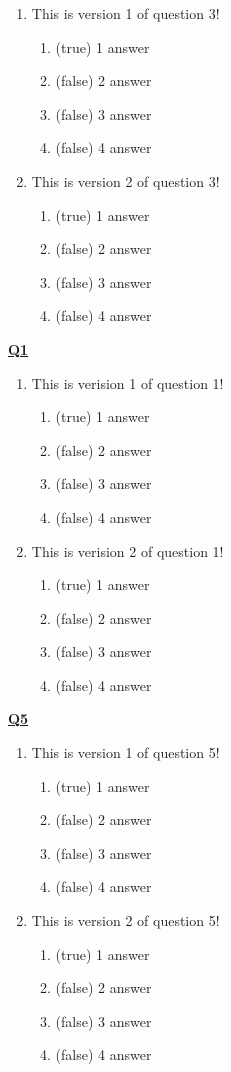 \documentclass[a4paper, 11pt]{article}
\begin{document}
\begin{enumerate}
\item This is version 1 of question 3!
\begin{enumerate}
\item (true)  1 answer
\item (false)  2 answer
\item (false)  3 answer
\item (false)  4 answer
\end{enumerate}
\item This is version 2 of question 3!
\begin{enumerate}
\item (true)  1 answer
\item (false)  2 answer
\item (false)  3 answer
\item (false)  4 answer
\end{enumerate}
\end{enumerate}
\flushleft \underline{\bf Q1 }
\begin{enumerate}
\item This is verision 1 of question 1!
\begin{enumerate}
\item (true)  1 answer
\item (false)  2 answer
\item (false)  3 answer
\item (false)  4 answer
\end{enumerate}
\item This is verision 2 of question 1!
\begin{enumerate}
\item (true)  1 answer
\item (false)  2 answer
\item (false)  3 answer
\item (false)  4 answer
\end{enumerate}
\end{enumerate}
\flushleft \underline{\bf Q5 }
\begin{enumerate}
\item This is version 1 of question 5!
\begin{enumerate}
\item (true)  1 answer
\item (false)  2 answer
\item (false)  3 answer
\item (false)  4 answer
\end{enumerate}
\item This is version 2 of question 5!
\begin{enumerate}
\item (true)  1 answer
\item (false)  2 answer
\item (false)  3 answer
\item (false)  4 answer
\end{enumerate}
\end{enumerate}
\end{document}
